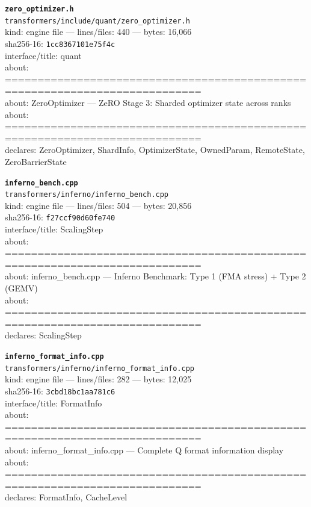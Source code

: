 \noindent\textbf{\texttt{zero\_optimizer.h}}\\
\texttt{transformers/include/quant/zero\_optimizer.h}\\
kind: engine file --- lines/files: 440 --- bytes: 16,066\\
sha256-16: \texttt{1cc8367101e75f4c}\\
interface/title: quant\\
about: ============================================================================\\
about: ZeroOptimizer — ZeRO Stage 3: Sharded optimizer state across ranks\\
about: ============================================================================\\
declares: ZeroOptimizer, ShardInfo, OptimizerState, OwnedParam, RemoteState, ZeroBarrierState\\
\vspace*{6.0pt}

\noindent\textbf{\texttt{inferno\_bench.cpp}}\\
\texttt{transformers/inferno/inferno\_bench.cpp}\\
kind: engine file --- lines/files: 504 --- bytes: 20,856\\
sha256-16: \texttt{f27ccf90d60fe740}\\
interface/title: ScalingStep\\
about: ============================================================================\\
about: inferno\_bench.cpp — Inferno Benchmark: Type 1 (FMA stress) + Type 2 (GEMV)\\
about: ============================================================================\\
declares: ScalingStep\\
\vspace*{6.0pt}

\noindent\textbf{\texttt{inferno\_format\_info.cpp}}\\
\texttt{transformers/inferno/inferno\_format\_info.cpp}\\
kind: engine file --- lines/files: 282 --- bytes: 12,025\\
sha256-16: \texttt{3cbd18bc1aa781c6}\\
interface/title: FormatInfo\\
about: ============================================================================\\
about: inferno\_format\_info.cpp — Complete Q format information display\\
about: ============================================================================\\
declares: FormatInfo, CacheLevel\\
\vspace*{6.0pt}
\newpage

